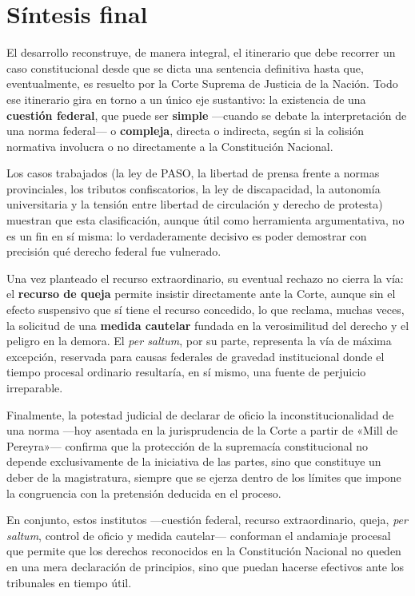 \documentclass[12pt,oneside]{book}
\begin{document}
\chapter*{Síntesis final}
{}

El desarrollo reconstruye, de manera integral, el itinerario que debe recorrer un caso constitucional desde que se dicta una sentencia definitiva hasta que, eventualmente, es resuelto por la Corte Suprema de Justicia de la Nación. Todo ese itinerario gira en torno a un único eje sustantivo: la existencia de una \textbf{cuestión federal}, que puede ser \textbf{simple} —cuando se debate la interpretación de una norma federal— o \textbf{compleja}, directa o indirecta, según si la colisión normativa involucra o no directamente a la Constitución Nacional.

Los casos trabajados (la ley de PASO, la libertad de prensa frente a normas provinciales, los tributos confiscatorios, la ley de discapacidad, la autonomía universitaria y la tensión entre libertad de circulación y derecho de protesta) muestran que esta clasificación, aunque útil como herramienta argumentativa, no es un fin en sí misma: lo verdaderamente decisivo es poder demostrar con precisión qué derecho federal fue vulnerado.

Una vez planteado el recurso extraordinario, su eventual rechazo no cierra la vía: el \textbf{recurso de queja} permite insistir directamente ante la Corte, aunque sin el efecto suspensivo que sí tiene el recurso concedido, lo que reclama, muchas veces, la solicitud de una \textbf{medida cautelar} fundada en la verosimilitud del derecho y el peligro en la demora. El \textit{per saltum}, por su parte, representa la vía de máxima excepción, reservada para causas federales de gravedad institucional donde el tiempo procesal ordinario resultaría, en sí mismo, una fuente de perjuicio irreparable.

Finalmente, la potestad judicial de declarar de oficio la inconstitucionalidad de una norma —hoy asentada en la jurisprudencia de la Corte a partir de «Mill de Pereyra»— confirma que la protección de la supremacía constitucional no depende exclusivamente de la iniciativa de las partes, sino que constituye un deber de la magistratura, siempre que se ejerza dentro de los límites que impone la congruencia con la pretensión deducida en el proceso.

En conjunto, estos institutos —cuestión federal, recurso extraordinario, queja, \textit{per saltum}, control de oficio y medida cautelar— conforman el andamiaje procesal que permite que los derechos reconocidos en la Constitución Nacional no queden en una mera declaración de principios, sino que puedan hacerse efectivos ante los tribunales en tiempo útil.
\end{document}
